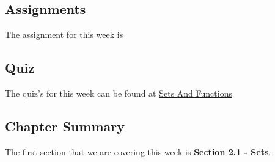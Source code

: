 \subsection{Assignments}

The assignment for this week is   

\subsection{Quiz}

The quiz's for this week can be found at \href{https://applied.cs.colorado.edu/mod/quiz/view.php?id=51619}{Sets And Functions} \textbullet {}  

\subsection{Chapter Summary}

The first section that we are covering this week is \textbf{Section 2.1 - Sets}.

